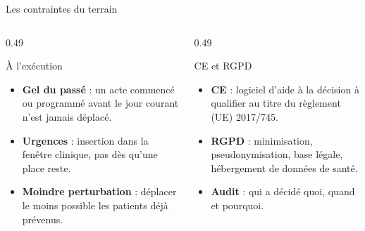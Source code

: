 \begin{frame}{Les contraintes du terrain}
  \scriptsize
  \begin{columns}[T,onlytextwidth]
    \begin{column}{0.49\textwidth}
      \begin{block}{À l'exécution}
        \begin{itemize}
          \item \textbf{Gel du passé} : un acte commencé ou programmé avant le
            jour courant n'est jamais déplacé.
          \item \textbf{Urgences} : insertion dans la fenêtre clinique, pas dès
            qu'une place reste.
          \item \textbf{Moindre perturbation} : déplacer le moins possible les
            patients déjà prévenus.
        \end{itemize}
      \end{block}
    \end{column}

    \begin{column}{0.49\textwidth}
      \begin{alertblock}{CE et RGPD}
        \begin{itemize}
          \item \textbf{CE} : logiciel d'aide à la décision à qualifier au
            titre du règlement (UE) 2017/745.
          \item \textbf{RGPD} : minimisation, pseudonymisation, base légale,
            hébergement de données de santé.
          \item \textbf{Audit} : qui a décidé quoi, quand et pourquoi.
        \end{itemize}
      \end{alertblock}
    \end{column}
  \end{columns}
\end{frame}

